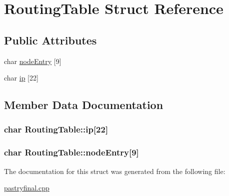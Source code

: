 \hypertarget{structRoutingTable}{\section{Routing\-Table Struct Reference}
\label{structRoutingTable}
}
\subsection*{Public Attributes}
\begin{DoxyCompactItemize}
\item 
char \hyperlink{structRoutingTable_a68e60b82de7028edf994a6947b5419ae}{node\-Entry} \mbox{[}9\mbox{]}
\item 
char \hyperlink{structRoutingTable_a78bd90c64e38c527a16ed702ca9c2b00}{ip} \mbox{[}22\mbox{]}
\end{DoxyCompactItemize}


\subsection{Member Data Documentation}
\hypertarget{structRoutingTable_a78bd90c64e38c527a16ed702ca9c2b00}{
\subsubsection[{ip}]{\setlength{\rightskip}{0pt plus 5cm}char Routing\-Table\-::ip\mbox{[}22\mbox{]}}}\label{structRoutingTable_a78bd90c64e38c527a16ed702ca9c2b00}
\hypertarget{structRoutingTable_a68e60b82de7028edf994a6947b5419ae}{
\subsubsection[{node\-Entry}]{\setlength{\rightskip}{0pt plus 5cm}char Routing\-Table\-::node\-Entry\mbox{[}9\mbox{]}}}\label{structRoutingTable_a68e60b82de7028edf994a6947b5419ae}


The documentation for this struct was generated from the following file\-:\begin{DoxyCompactItemize}
\item 
\hyperlink{pastryfinal_8cpp}{pastryfinal.\-cpp}\end{DoxyCompactItemize}
